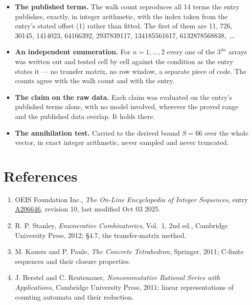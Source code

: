 \documentclass[11pt]{article}
\theoremstyle{definition}
\begin{document}
\begin{itemize}

\item {\bfseries The published terms.} The walk count reproduces all 14 terms the entry publishes, exactly, in integer arithmetic, with the index taken from the entry's stated offset (1) rather than fitted. The first of them are 11, 726, 30145, 1414023, 64166392, 2937839117, 134185561617, 6132878568838,~\dots

\item {\bfseries An independent enumeration.} For $n = 1,\dots,2$ every one of the $3^{4n}$ arrays was written out and tested cell by cell against the condition as the entry states it --- no transfer matrix, no row window, a separate piece of code. The counts agree with the walk count and with the entry.

\item {\bfseries The claim on the raw data.} Each claim was evaluated on the entry's published terms alone, with no model involved, wherever the proved range and the published data overlap. It holds there.

\item {\bfseries The annihilation test.} Carried to the derived bound $S = 66$ over the whole vector, in exact integer arithmetic, never sampled and never truncated.

\end{itemize}

\section{References}

\begin{enumerate}

\item OEIS Foundation Inc., \emph{The On-Line Encyclopedia of Integer Sequences}, entry \href{https://oeis.org/A206646}{A206646}, revision 10, last modified Oct 03 2025.

\item R. P. Stanley, \emph{Enumerative Combinatorics}, Vol.~1, 2nd ed., Cambridge University Press, 2012; \S4.7, the transfer-matrix method.

\item M. Kauers and P. Paule, \emph{The Concrete Tetrahedron}, Springer, 2011; C-finite sequences and their closure properties.

\item J. Berstel and C. Reutenauer, \emph{Noncommutative Rational Series with Applications}, Cambridge University Press, 2011; linear representations of counting automata and their reduction.

\end{enumerate}
\end{document}
